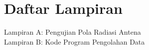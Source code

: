 \chapter*{Daftar Lampiran}
\noindent
Lampiran A: Pengujian Pola Radiasi Antena\\
Lampiran B: Kode Program Pengolahan Data
